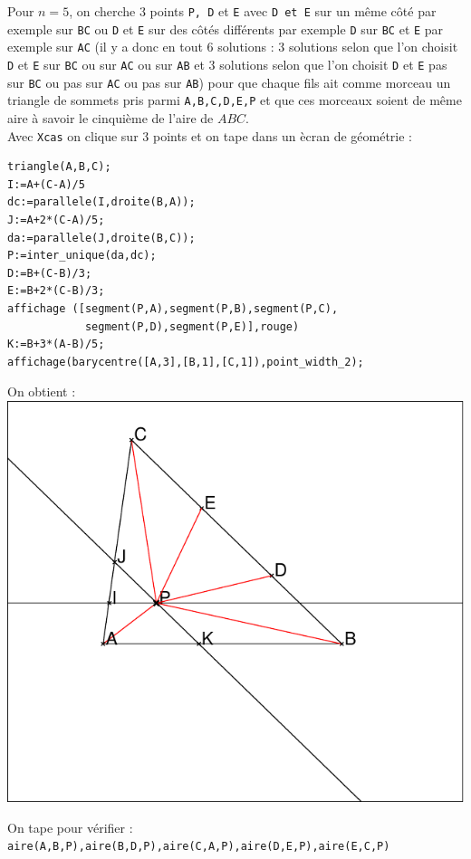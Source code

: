 \documentclass[a4paper,11pt]{book}
\begin{document}
Pour $n=5$, on cherche 3 points {\tt P, D} et {\tt E} avec {\tt D et E} sur un 
m\^eme c\^ot\'e par exemple sur {\tt BC} ou {\tt D} et {\tt E} sur des 
c\^ot\'es diff\'erents par exemple {\tt D} sur {\tt BC} et {\tt E} 
par exemple sur {\tt AC} (il y a donc en tout 6 solutions : 3 solutions selon 
que l'on choisit {\tt D} et {\tt E} sur {\tt BC} ou  sur {\tt AC} ou  sur 
{\tt AB} et 3 solutions selon que l'on choisit {\tt D} et {\tt E} pas sur 
{\tt BC} ou pas sur {\tt AC} ou pas sur {\tt AB}) 
pour que chaque fils ait comme morceau un triangle de sommets pris parmi
{\tt A,B,C,D,E,P}
et que ces morceaux soient de  m\^eme aire \`a savoir le cinqui\`eme de l'aire 
de  
$ABC$.\\
Avec {\tt Xcas} on clique sur 3 points et on 
tape dans un \`ecran de g\'eom\'etrie :\\
\begin{verbatim}
triangle(A,B,C);
I:=A+(C-A)/5
dc:=parallele(I,droite(B,A));
J:=A+2*(C-A)/5;
da:=parallele(J,droite(B,C));
P:=inter_unique(da,dc);
D:=B+(C-B)/3;
E:=B+2*(C-B)/3;
affichage ([segment(P,A),segment(P,B),segment(P,C),
            segment(P,D),segment(P,E)],rouge)
K:=B+3*(A-B)/5;
affichage(barycentre([A,3],[B,1],[C,1]),point_width_2);
\end{verbatim}
On obtient :\\

\includegraphics[width=\textwidth]{triangle5}

On tape pour v\'erifier :\\
{\tt aire(A,B,P),aire(B,D,P),aire(C,A,P),aire(D,E,P),aire(E,C,P)}\\
\end{document}
